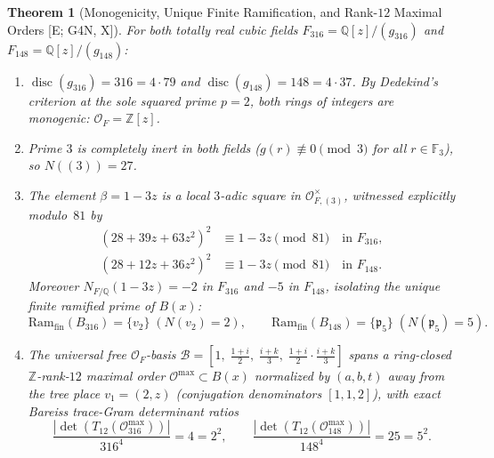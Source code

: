 \documentclass[11pt]{amsart}
\numberwithin{equation}{section}
\theoremstyle{plain}
\newtheorem{theorem}{Theorem}[section]
\theoremstyle{definition}\newtheorem{definition}[theorem]{Definition}
\theoremstyle{remark}\newtheorem{remark}[theorem]{Remark}
\newcommand{\Q}{\mathbb{Q}}
\newcommand{\Z}{\mathbb{Z}}
\newcommand{\F}{\mathbb{F}}
\newcommand{\calO}{\mathcal{O}}
\newcommand{\frp}{\mathfrak{p}}
\newcommand{\Ram}{\mathrm{Ram}}
\newcommand{\ctag}[1]{\textup{\textsf{\scriptsize[#1]}}}
\begin{document}
\begin{theorem}[Monogenicity, Unique Finite Ramification, and Rank-$12$ Maximal Orders \ctag{E; G4N, X}]\label{thm:cubic_orders}
For both totally real cubic fields $F_{316} = \Q[z]/(g_{316})$ and $F_{148} = \Q[z]/(g_{148})$:
\begin{enumerate}[label=(\roman*),nosep]
\item $\operatorname{disc}(g_{316}) = 316 = 4\cdot 79$ and $\operatorname{disc}(g_{148}) = 148 = 4\cdot 37$. By Dedekind's criterion at the sole squared prime $p=2$, both rings of integers are monogenic: $\calO_F = \Z[z]$.
\item Prime $3$ is completely inert in both fields ($g(r)\not\equiv 0 \pmod 3$ for all $r\in\F_3$), so $N((3)) = 27$.
\item The element $\beta = 1 - 3z$ is a local $3$-adic square in $\calO_{F,(3)}^\times$, witnessed explicitly modulo~$81$ by
\begin{equation}\label{eq:mod81_sqrts}
\begin{aligned}
(28 + 39z + 63z^2)^2 &\equiv 1 - 3z \pmod{81} \quad\text{in } F_{316}, \\
(28 + 12z + 36z^2)^2 &\equiv 1 - 3z \pmod{81} \quad\text{in } F_{148}.
\end{aligned}
\end{equation}
Moreover $N_{F/\Q}(1 - 3z) = -2$ in $F_{316}$ and $-5$ in $F_{148}$, isolating the unique finite ramified prime of $B(x)$:
\begin{equation}\label{eq:cubic_ram}
\Ram_{\mathrm{fin}}(B_{316}) = \{v_2\}\; (N(v_2)=2), \qquad \Ram_{\mathrm{fin}}(B_{148}) = \{\frp_5\}\; (N(\frp_5)=5).
\end{equation}
\item The universal free $\calO_F$-basis $\mathcal{B} = [1,\; \frac{1+i}{2},\; \frac{i+k}{3},\; \frac{1+i}{2}\cdot\frac{i+k}{3}]$ spans a ring-closed $\Z$-rank-$12$ maximal order $\calO^{\max} \subset B(x)$ normalized by $(a,b,t)$ away from the tree place $v_1=(2,z)$ (conjugation denominators $[1,1,2]$), with exact Bareiss trace-Gram determinant ratios
\begin{equation}\label{eq:cubic_gram}
\frac{|\det(T_{12}(\calO_{316}^{\max}))|}{316^4} = 4 = 2^2, \qquad \frac{|\det(T_{12}(\calO_{148}^{\max}))|}{148^4} = 25 = 5^2.
\end{equation}
\end{enumerate}
\end{theorem}
\end{document}
